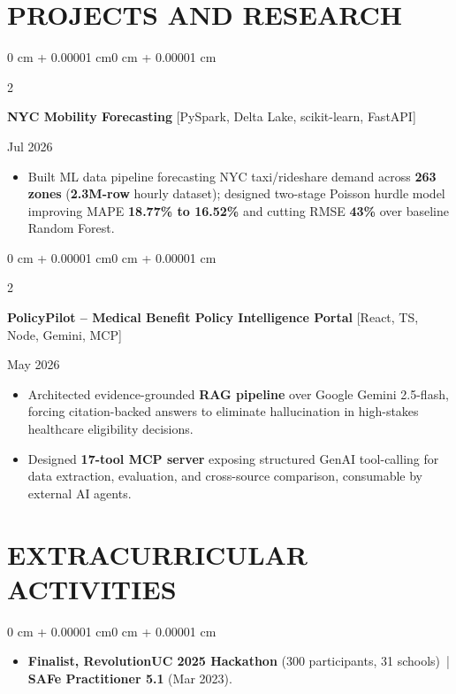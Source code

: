 \documentclass[10pt, letterpaper]{article}
\newenvironment{highlights}{
    \begin{itemize}[
        topsep=0.10 cm,
        parsep=0.06 cm,
        partopsep=0pt,
        itemsep=0.06 cm,
        leftmargin=12pt
    ]
}{
    \end{itemize}
}
\newenvironment{onecolentry}{
    \begin{adjustwidth}{0 cm + 0.00001 cm}{0 cm + 0.00001 cm}
}{
    \end{adjustwidth}
}
\newenvironment{twocolentry}[2][]{
    \onecolentry
    \def\secondColumn{#2}
    \setcolumnwidth{\fill, 4.5 cm}
    \begin{paracol}{2}
}{
    \switchcolumn \raggedleft \secondColumn
    \end{paracol}
    \endonecolentry
}
\begin{document}
\section{PROJECTS AND RESEARCH}
\begin{twocolentry}{Jul 2026}
\textbf{NYC Mobility Forecasting} [PySpark, Delta Lake, scikit-learn, FastAPI]
\end{twocolentry}
\begin{highlights}
  \item Built ML data pipeline forecasting NYC taxi/rideshare demand across \textbf{263 zones} (\textbf{2.3M-row} hourly dataset); designed two-stage Poisson hurdle model improving MAPE \textbf{18.77\% to 16.52\%} and cutting RMSE \textbf{43\%} over baseline Random Forest.
\end{highlights}

\vspace{0.12 cm}

\begin{twocolentry}{May 2026}
\textbf{PolicyPilot -- Medical Benefit Policy Intelligence Portal} [React, TS, Node, Gemini, MCP]
\end{twocolentry}
\begin{highlights}
  \item Architected evidence-grounded \textbf{RAG pipeline} over Google Gemini 2.5-flash, forcing citation-backed answers to eliminate hallucination in high-stakes healthcare eligibility decisions.
  \item Designed \textbf{17-tool MCP server} exposing structured GenAI tool-calling for data extraction, evaluation, and cross-source comparison, consumable by external AI agents.
\end{highlights}

\section{EXTRACURRICULAR ACTIVITIES}
\begin{onecolentry}
\begin{highlights}
  \item \textbf{Finalist, RevolutionUC 2025 Hackathon} (300 participants, 31 schools) \,|\, \textbf{SAFe Practitioner 5.1} (Mar 2023).
\end{highlights}
\end{onecolentry}
\end{document}
